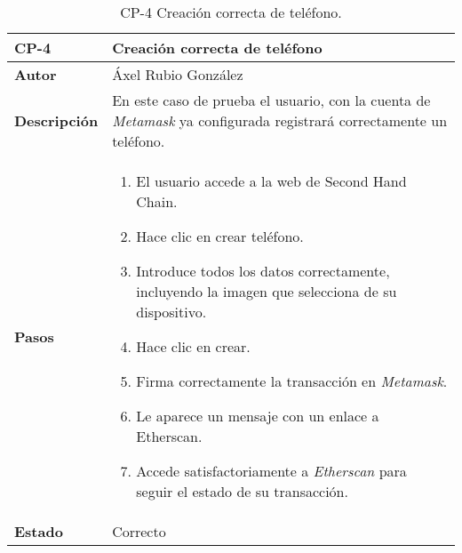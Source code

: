 \begin{table}[p]
	\centering
	\begin{tabularx}{\linewidth}{ p{} p{} }
		\toprule
		\textbf{CP-4}    & \textbf{Creación correcta de teléfono}\\
		\toprule
		\textbf{Autor}                & Áxel Rubio González \\
		\textbf{Descripción}          & En este caso de prueba el usuario, con la cuenta de \textit{Metamask} ya configurada  registrará correctamente un teléfono. \\
		\textbf{Pasos}             &
		\begin{enumerate}
			\def\labelenumi{\arabic{enumi}.}
			\tightlist
			\item El usuario accede a la web de Second Hand Chain.
                \item Hace clic en crear teléfono.
                \item Introduce todos los datos correctamente, incluyendo la imagen que selecciona de su dispositivo.
                \item Hace clic en crear.
                \item Firma correctamente la transacción en \textit{Metamask}.
                \item Le aparece un mensaje con un enlace a Etherscan.
                \item Accede satisfactoriamente a \textit{Etherscan} para seguir el estado de su transacción.
		\end{enumerate}\\
		\textbf{Estado}          & Correcto \\
		\bottomrule
	\end{tabularx}
	\caption{CP-4 Creación correcta de teléfono.}
\end{table}

